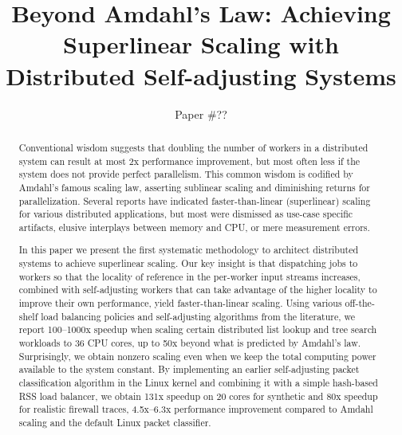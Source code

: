 \documentclass[letterpaper,twocolumn,10pt]{article}
\begin{document}


\title{Beyond Amdahl's Law: Achieving Superlinear Scaling with\\Distributed Self-adjusting Systems}

\author{Paper \#??} %

\maketitle

\begin{abstract}
  Conventional wisdom suggests that doubling the number of workers in a distributed system can result at most 2x performance improvement, but most often less if the system does not provide perfect parallelism.  This common wisdom is codified by Amdahl's famous scaling law, asserting sublinear scaling and diminishing returns for parallelization. Several reports have indicated faster-than-linear (superlinear) scaling for various distributed applications, but most were dismissed as use-case specific artifacts, elusive interplays between memory and CPU, or mere measurement errors.

  In this paper we present the first systematic methodology to architect distributed systems to achieve superlinear scaling. Our key insight is that dispatching jobs to workers so that the locality of reference in the per-worker input streams increases, combined with self-adjusting workers that can take advantage of the higher locality to improve their own performance, yield faster-than-linear scaling. Using various off-the-shelf load balancing policies and self-adjusting algorithms from the literature, we report 100--1000x speedup when scaling certain distributed list lookup and tree search workloads to 36 CPU cores, up to 50x beyond what is predicted by Amdahl's law.  Surprisingly, we obtain nonzero scaling even when we keep the total computing power available to the system constant. By implementing an earlier self-adjusting packet classification algorithm in the Linux kernel and combining it with a simple hash-based RSS load balancer, we obtain 131x speedup on 20 cores for synthetic and 80x speedup for realistic firewall traces, 4.5x--6.3x performance improvement compared to Amdahl scaling and the default Linux packet classifier.
\end{abstract}
\end{document}
